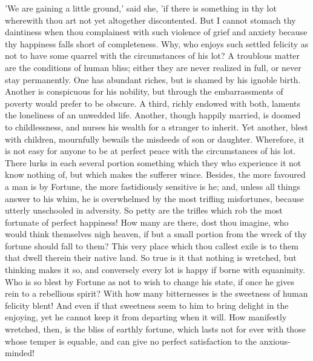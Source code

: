 'We are gaining a little ground,' said she, 'if there is something in
thy lot wherewith thou art not yet altogether discontented. But I cannot
stomach thy daintiness when thou complainest with such violence of grief
and anxiety because thy happiness falls short of completeness. Why, who
enjoys such settled felicity as not to have some quarrel with the
circumstances of his lot? A troublous matter are the conditions of human
bliss; either they are never realized in full, or never stay
permanently. One has abundant riches, but is shamed by his ignoble
birth. Another is conspicuous for his nobility, but through the
embarrassments of poverty would prefer to be obscure. A third, richly
endowed with both, laments the loneliness of an unwedded life. Another,
though happily married, is doomed to childlessness, and nurses his
wealth for a stranger to inherit. Yet another, blest with children,
mournfully bewails the misdeeds of son or daughter. Wherefore, it is not
easy for anyone to be at perfect peace with the circumstances of his
lot. There lurks in each several portion something which they who
experience it not know nothing of, but which makes the sufferer wince.
Besides, the more favoured a man is by Fortune, the more fastidiously
sensitive is he; and, unless all things answer to his whim, he is
overwhelmed by the most trifling misfortunes, because utterly unschooled
in adversity. So petty are the trifles which rob the most fortunate of
perfect happiness! How many are there, dost thou imagine, who would
think themselves nigh heaven, if but a small portion from the wreck of
thy fortune should fall to them? This very place which thou callest
exile is to them that dwell therein their native land. So true is it
that nothing is wretched, but thinking makes it so, and conversely every
lot is happy if borne with equanimity. Who is so blest by Fortune as not
to wish to change his state, if once he gives rein to a rebellious
spirit? With how many bitternesses is the sweetness of human felicity
blent! And even if that sweetness seem to him to bring delight in the
enjoying, yet he cannot keep it from departing when it will. How
manifestly wretched, then, is the bliss of earthly fortune, which lasts
not for ever with those whose temper is equable, and can give no perfect
satisfaction to the anxious-minded!

